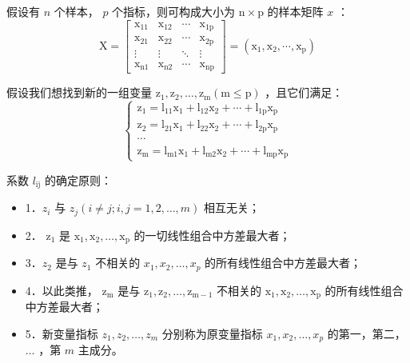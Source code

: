 \begin{theorem}[主成分分析的思想]
    假设有 $n$ 个样本， $p$ 个指标，则可构成大小为 $\mathrm{n} \times \mathrm{p}$ 的样本矩阵 $x$ ：
    $$
        \mathrm{X}=\left[\begin{array}{cccc}
                \mathrm{x}_{11}           & \mathrm{x}_{12}           & \cdots & \mathrm{x}_{1 \mathrm{p}} \\
                \mathrm{x}_{21}           & \mathrm{x}_{22}           & \cdots & \mathrm{x}_{2 \mathrm{p}} \\
                \vdots                    & \vdots                    & \ddots & \vdots                    \\
                \mathrm{x}_{\mathrm{n} 1} & \mathrm{x}_{\mathrm{n} 2} & \cdots & \mathrm{x}_{\mathrm{np}}
            \end{array}\right]=\left(\mathrm{x}_1, \mathrm{x}_2, \cdots, \mathrm{x}_{\mathrm{p}}\right)
    $$

    假设我们想找到新的一组变量 $\mathrm{z}_1, \mathrm{z}_2, \ldots, \mathrm{z}_{\mathrm{m}}(\mathrm{m} \leq \mathrm{p})$ ，且它们满足：
    $$
        \left\{\begin{array}{l}
            \mathrm{z}_1=\mathrm{l}_{11} \mathrm{x}_1+\mathrm{l}_{12} \mathrm{x}_2+\cdots+\mathrm{l}_{1 \mathrm{p}} \mathrm{x}_{\mathrm{p}} \\
            \mathrm{z}_2=\mathrm{l}_{21} \mathrm{x}_1+\mathrm{l}_{22} \mathrm{x}_2+\cdots+\mathrm{l}_{2 \mathrm{p}} \mathrm{x}_{\mathrm{p}} \\
            \cdots                                                                                                                          \\
            \mathrm{z}_{\mathrm{m}}=\mathrm{l}_{\mathrm{m} 1} \mathrm{x}_1+\mathrm{l}_{\mathrm{m} 2} \mathrm{x}_2+\cdots+\mathrm{l}_{\mathrm{mp}} \mathrm{x}_{\mathrm{p}}
        \end{array}\right.
    $$

    系数 $l_{\mathrm{ij}}$ 的确定原则：
    \begin{itemize}
        \item 1．$z_i$ 与 $z_j(i \neq j ; i, j=1,2, \ldots, m)$ 相互无关；
        \item 2． $\mathrm{z}_1$ 是 $\mathrm{x}_1, \mathrm{x}_2, \ldots, \mathrm{x}_{\mathrm{p}}$ 的一切线性组合中方差最大者；
        \item 3．$z_2$ 是与 $z_1$ 不相关的 $x_1, x_2, \ldots, x_p$ 的所有线性组合中方差最大者；
        \item 4．以此类推， $\mathrm{z}_{\mathrm{m}}$ 是与 $\mathrm{z}_1, \mathrm{z}_2, \ldots, \mathrm{z}_{\mathrm{m}-1}$ 不相关的 $\mathrm{x}_1, \mathrm{x}_2, \ldots, \mathrm{x}_{\mathrm{p}}$ 的所有线性组合中方差最大者；
        \item 5．新变量指标 $z_1, z_2, \ldots, z_m$ 分别称为原变量指标 $x_1, x_2, \ldots, x_p$ 的第一，第二，$\ldots$ ，第 $m$ 主成分。
    \end{itemize}
\end{theorem}

